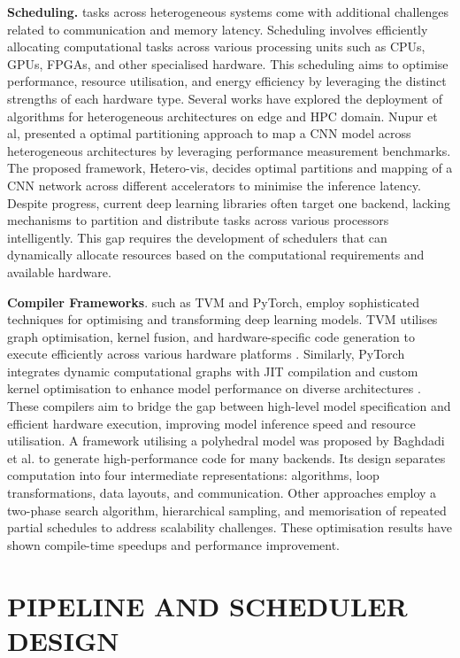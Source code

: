 \documentclass[]{spie}  %
\begin{document}
\noindent\textbf{Scheduling.} tasks across heterogeneous systems come with additional challenges related to communication and memory latency. Scheduling involves efficiently allocating computational tasks across various processing units such as CPUs, GPUs, FPGAs, and other specialised hardware. This scheduling aims to optimise performance, resource utilisation, and energy efficiency by leveraging the distinct strengths of each hardware type. Several works have explored the deployment of algorithms for heterogeneous architectures on edge and HPC domain\cite{KheHardMue24,RatGouHog23}.  Nupur et al\cite{SumRaw22}, presented a optimal partitioning approach to map a CNN model across heterogeneous architectures by leveraging performance measurement benchmarks. The proposed framework, Hetero-vis, decides optimal partitions and mapping of a CNN network across different accelerators to minimise the inference latency. Despite progress, current deep learning libraries often target one backend, lacking mechanisms to partition and distribute tasks across various processors intelligently. This gap requires the development of schedulers that can dynamically allocate resources based on the computational requirements and available hardware\cite{KanLeeKil21, LanBhaSou2016}.

\noindent\textbf{Compiler Frameworks}. such as TVM and PyTorch, employ sophisticated techniques for optimising and transforming deep learning models. TVM utilises graph optimisation, kernel fusion, and hardware-specific code generation to execute efficiently across various hardware platforms \cite{chen2018}. Similarly, PyTorch integrates dynamic computational graphs with JIT compilation and custom kernel optimisation to enhance model performance on diverse architectures \cite{Pytorch}. These compilers aim to bridge the gap between high-level model specification and efficient hardware execution, improving model inference speed and resource utilisation. A framework utilising a polyhedral model was proposed by Baghdadi et al.\cite{BagRiyRay19} to generate high-performance code for many backends. Its design separates computation into four intermediate representations: algorithms, loop transformations, data layouts, and communication. Other approaches employ a two-phase search algorithm, hierarchical sampling, and memorisation of repeated partial schedules to address scalability challenges. These optimisation results have shown compile-time speedups and performance improvement\cite{Halide2018}.


\section{PIPELINE AND SCHEDULER DESIGN}
\label{sec:methodology}
\end{document}
